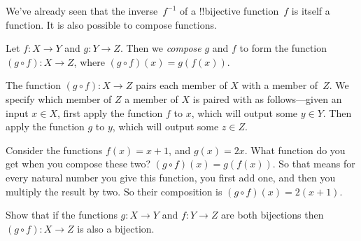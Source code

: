 \documentclass[../../include/open-logic-section]{subfiles}
\begin{document}

\begin{explain}
We've already seen that the inverse~$f^{-1}$ of a !!{bijective}
function~$f$ is itself a function. It is also possible to compose
functions.
\end{explain}

\begin{defn}
 Let $f: X \rightarrow Y$ and $g: Y \rightarrow Z$. Then we
 \emph{compose} $g$ and $f$ to form the function $(g \circ f) \colon X
 \rightarrow Z$, where $(g \circ f)(x) = g(f(x))$.
\end{defn}

\begin{explain}
The function $(g \circ f) \colon X \rightarrow Z$ pairs each member of
$X$ with a member of~$Z$. We specify which member of $Z$ a member of
$X$ is paired with as follows---given an input $x \in X$, first apply
the function $f$ to $x$, which will output some $y \in Y$. Then apply
the function $g$ to $y$, which will output some $z \in Z$.
\end{explain}

\begin{ex}
Consider the functions $f(x) = x + 1$, and $g(x) = 2x$. What function
do you get when you compose these two? $(g \circ f)(x) = g(f(x))$. So
that means for every natural number you give this function, you first
add one, and then you multiply the result by two. So their composition
is $(g \circ f)(x) = 2(x+1)$.
\end{ex}

\begin{prob}
Show that if the functions $g \colon X \rightarrow Y$ and $f \colon Y
\rightarrow Z$ are both bijections then $(g \circ f) \colon X
\rightarrow Z$ is also a bijection.
\end{prob}
\end{document}
